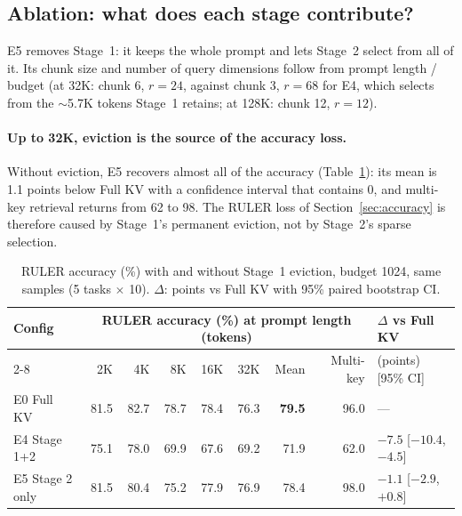 \documentclass[10pt,letterpaper]{article}
\newcommand{\best}[1]{\textbf{#1}}
\begin{document}
\subsection{Ablation: what does each stage contribute?}
\label{sec:ablation}

E5 removes Stage~1: it keeps the whole prompt and lets Stage~2 select from all of it. Its chunk size and number of query dimensions follow from prompt length / budget (at 32K: chunk 6, $r = 24$, against chunk 3, $r = 68$ for E4, which selects from the $\sim$5.7K tokens Stage~1 retains; at 128K: chunk 12, $r = 12$).

\paragraph{Up to 32K, eviction is the source of the accuracy loss.}
Without eviction, E5 recovers almost all of the accuracy (Table~\ref{tab:ablation}): its mean is 1.1 points below Full KV with a confidence interval that contains 0, and multi-key retrieval returns from 62 to 98. The RULER loss of Section~\ref{sec:accuracy} is therefore caused by Stage~1's permanent eviction, not by Stage~2's sparse selection.

\begin{table}[h]
\centering\small
\caption{RULER accuracy (\%) with and without Stage~1 eviction, budget 1024, same samples (5 tasks $\times$ 10). $\Delta$: points vs Full KV with 95\% paired bootstrap CI.}
\label{tab:ablation}
\setlength{\tabcolsep}{4pt}
\begin{tabular}{lrrrrrrrl}
\toprule
Config & \multicolumn{7}{c}{RULER accuracy (\%) at prompt length (tokens)} & $\Delta$ vs Full KV \\
\cmidrule(lr){2-8}
 & 2K & 4K & 8K & 16K & 32K & Mean & Multi-key & (points) [95\% CI] \\
\midrule
E0 Full KV & 81.5 & 82.7 & 78.7 & 78.4 & 76.3 & \best{79.5} & 96.0 & --- \\
E4 Stage 1+2 & 75.1 & 78.0 & 69.9 & 67.6 & 69.2 & 71.9 & 62.0 & $-7.5$ [$-10.4$, $-4.5$] \\
E5 Stage 2 only & 81.5 & 80.4 & 75.2 & 77.9 & 76.9 & 78.4 & 98.0 & $-1.1$ [$-2.9$, $+0.8$] \\
\bottomrule
\end{tabular}
\end{table}
\end{document}
